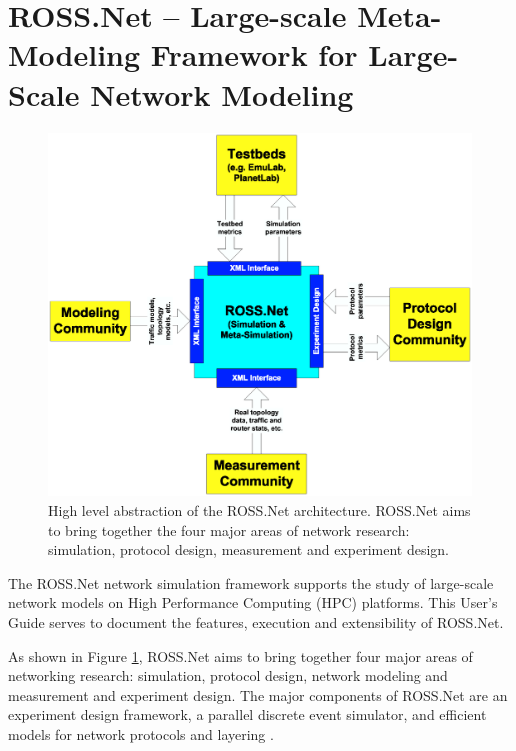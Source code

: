 \documentclass[12pt]{article}
\begin{document}
\newpage

\section{ROSS.Net -- Large-scale Meta-Modeling Framework for Large-Scale
  Network Modeling}

\begin{figure}[!h]
\centering
\includegraphics[width=5in]{rn_combines.ps}
\caption{High level abstraction of the ROSS.Net architecture. ROSS.Net aims to
  bring together the four major areas of network research: simulation,
  protocol design, measurement and experiment design.}
\label{fig-rn-arch}
\end{figure}

The ROSS.Net network simulation framework supports the study of large-scale
network models on High Performance Computing (HPC) platforms.  This User's
Guide serves to document the features, execution and extensibility of
ROSS.Net.

As shown in Figure \ref{fig-rn-arch}, ROSS.Net aims to bring together four
major areas of networking research: simulation, protocol design, network
modeling and measurement and experiment design.  The major components of
ROSS.Net are an experiment design framework, a parallel discrete event
simulator, and efficient models for network protocols and layering
\cite{yaun-2003-1,bauer-2003, bauer-2004}.
\end{document}
